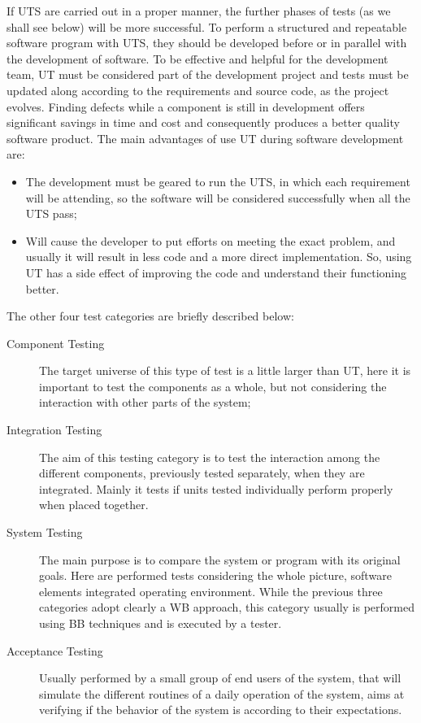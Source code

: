 If \ac{UTS} are carried out in a proper manner, the further phases of tests (as we shall see below) will be more successful.
To perform a structured and repeatable software program with \ac{UTS}, they should be developed before or in parallel with the development of software.
To be effective and helpful for the development team, \ac{UT} must be considered part of the development project
and tests must be updated along according to the requirements and source code, as the project evolves\cite{dustin2002effective}.
Finding defects while a component is still in development offers significant savings in time and cost and consequently produces a better quality software product.
The main advantages of use \ac{UT} during software development are\cite{dustin2002effective}:
\begin{itemize}
\item The development must be geared to run the \ac{UTS}, in which each requirement will be attending, so the software will be considered
successfully when all the \ac{UTS} pass;
\item Will cause the developer to put efforts on meeting the exact problem, and usually it will result in less code and a more direct implementation.
So, using \ac{UT} has a side effect of improving the code and understand their functioning better.
\end{itemize}

The other four test categories are briefly described below:

\begin{description}
\item[Component Testing] The target universe of this type of test is a little larger than \ac{UT},
here it is important to test the components as a whole, but not considering the interaction with other parts of the system;
\item[Integration Testing] The aim of this testing category is to
test the interaction among the different components, previously tested separately, when they are integrated.
Mainly it tests if units tested individually perform properly when placed together.
\item[System Testing]
The main purpose is to compare the system or program with its original goals.
Here are performed tests considering the whole picture, software elements integrated operating environment.
While the previous three categories adopt clearly a \ac{WB} approach, this category usually is performed using \ac{BB}
techniques and is executed by a tester.
\item[Acceptance Testing] Usually performed by a small group of end users of the system, that will simulate the
different routines of a daily  operation of the system, aims
at verifying if the behavior of the system is according to their expectations.
\end{description}

